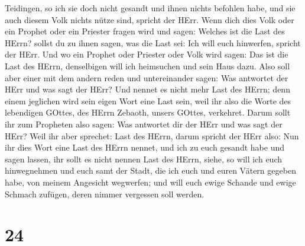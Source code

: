 Teidingen, so ich sie doch nicht gesandt und ihnen nichts befohlen habe,
und sie auch diesem Volk nichts nütze sind, spricht der HErr.
 Wenn dich dies Volk oder ein Prophet oder ein Priester
fragen wird und sagen: Welches ist die Last des HErrn? sollst du zu
ihnen sagen, was die Last sei: Ich will euch hinwerfen, spricht der
HErr.  Und wo ein Prophet oder Priester oder Volk wird
sagen: Das ist die Last des HErrn, denselbigen will ich heimsuchen und
sein Haus dazu.  Also soll aber einer mit dem andern reden
und untereinander sagen: Was antwortet der HErr und was sagt der HErr?
 Und nennet es nicht mehr Last des HErrn; denn einem
jeglichen wird sein eigen Wort eine Last sein, weil ihr also die Worte
des lebendigen GOttes, des HErrn Zebaoth, unsers GOttes, verkehret.
 Darum sollt ihr zum Propheten also sagen: Was antwortet
dir der HErr und was sagt der HErr?  Weil ihr aber
sprechet: Last des HErrn, darum spricht der HErr also: Nun ihr dies Wort
eine Last des HErrn nennet, und ich zu euch gesandt habe und sagen
lassen, ihr sollt es nicht nennen Last des HErrn,  siehe,
so will ich euch hinwegnehmen und euch samt der Stadt, die ich euch und
euren Vätern gegeben habe, von meinem Angesicht wegwerfen; 
und will euch ewige Schande und ewige Schmach zufügen, deren nimmer
vergessen soll werden.

\hypertarget{section-23}{%
\section{24}\label{section-23}}


